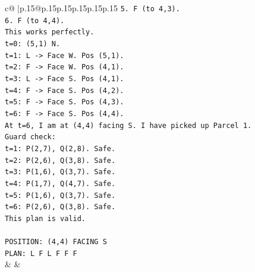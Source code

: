\documentclass{article}
\begin{document}
{\begin{supertabular}{c@{$\;$}|p{.15\linewidth}@{}p{.15\linewidth}p{.15\linewidth}p{.15\linewidth}p{.15\linewidth}p{.15\linewidth}}
{{{\texttt{5. F (to 4,3).} \\
\texttt{6. F (to 4,4).} \\
\texttt{This works perfectly.} \\
\texttt{t=0: (5,1) N.} \\
\texttt{t=1: L {-}> Face W. Pos (5,1).} \\
\texttt{t=2: F {-}> Face W. Pos (4,1).} \\
\texttt{t=3: L {-}> Face S. Pos (4,1).} \\
\texttt{t=4: F {-}> Face S. Pos (4,2).} \\
\texttt{t=5: F {-}> Face S. Pos (4,3).} \\
\texttt{t=6: F {-}> Face S. Pos (4,4).} \\
\texttt{At t=6, I am at (4,4) facing S. I have picked up Parcel 1.} \\
\texttt{Guard check:} \\
\texttt{t=1: P(2,7), Q(2,8). Safe.} \\
\texttt{t=2: P(2,6), Q(3,8). Safe.} \\
\texttt{t=3: P(1,6), Q(3,7). Safe.} \\
\texttt{t=4: P(1,7), Q(4,7). Safe.} \\
\texttt{t=5: P(1,6), Q(3,7). Safe.} \\
\texttt{t=6: P(2,6), Q(3,8). Safe.} \\
\texttt{This plan is valid.} \\
\\ 
\texttt{POSITION: (4,4) FACING S} \\
\texttt{PLAN: L F L F F F} \\
            }
        }
    }
    & & \\ \\


\end{supertabular}}
\end{document}
